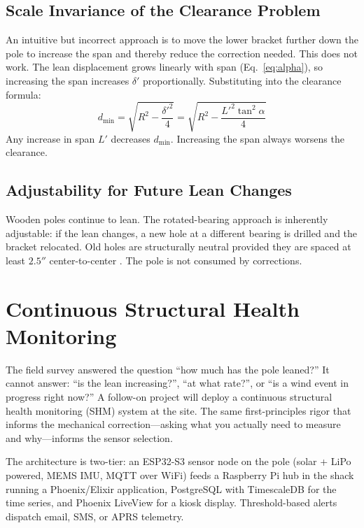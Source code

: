 \documentclass[11pt,twocolumn]{article}
\begin{document}
\subsection{Scale Invariance of the Clearance Problem}

An intuitive but incorrect approach is to move the lower bracket further down
the pole to increase the span and thereby reduce the correction needed. This
does not work. The lean displacement grows linearly with span (Eq.~\ref{eq:alpha}),
so increasing the span increases $\delta'$ proportionally. Substituting into
the clearance formula:
%
\begin{equation}
  d_\text{min} = \sqrt{R^2 - \frac{\delta'^2}{4}}
  = \sqrt{R^2 - \frac{L'^2\tan^2\alpha}{4}}
\end{equation}
%
Any increase in span $L'$ decreases $d_\text{min}$. Increasing the span always
worsens the clearance.

\subsection{Adjustability for Future Lean Changes}

Wooden poles continue to lean. The rotated-bearing approach is inherently
adjustable: if the lean changes, a new hole at a different bearing is drilled
and the bracket relocated. Old holes are structurally neutral provided they are
spaced at least $2.5''$ center-to-center \cite{NDS2024}. The pole is not
consumed by corrections.

\section{Continuous Structural Health Monitoring}

The field survey answered the question ``how much has the pole leaned?'' It
cannot answer: ``is the lean increasing?'', ``at what rate?'', or ``is a wind
event in progress right now?'' A follow-on project will deploy a continuous
structural health monitoring (SHM) system at the site. The same first-principles
rigor that informs the mechanical correction---asking what you actually need
to measure and why---informs the sensor selection.

The architecture is two-tier: an ESP32-S3 sensor node on the pole (solar +
LiPo powered, MEMS IMU, MQTT over WiFi) feeds a Raspberry Pi hub in the shack
running a Phoenix/Elixir application, PostgreSQL with TimescaleDB for the time
series, and Phoenix LiveView for a kiosk display. Threshold-based alerts
dispatch email, SMS, or APRS telemetry.
\end{document}
